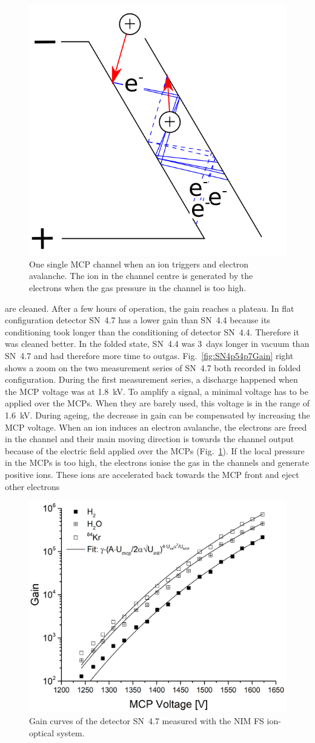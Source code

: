 	\begin{figure}[H]
		\centering
		\includegraphics[width=.3\textwidth]{Experiments/DischargeMod.png}
		\caption{One single MCP channel when an ion triggers and electron avalanche. The ion in the channel centre is generated by the electrons when the gas pressure in the channel is too high.}
		\label{fig:expDischMod}
	\end{figure}
	 are cleaned. After a few hours of operation, the gain reaches a plateau. In flat configuration detector SN~4.7 has a lower gain than SN~4.4 because its conditioning took longer than the conditioning of detector SN~4.4. Therefore it was cleaned better. In the folded state, SN~4.4 was 3~days longer in vacuum than SN~4.7 and had therefore more time to outgas. Fig.~\ref{fig:SN4p54p7Gain} right shows a zoom on the two measurement series of SN~4.7 both recorded in folded configuration. During the first measurement series, a discharge happened when the MCP voltage was at 1.8~kV. To amplify a signal, a minimal voltage has to be applied over the MCPs. When they are barely used, this voltage is in the range of 1.6~kV. During ageing, the decrease in gain can be compensated by increasing the MCP voltage. When an ion induces an electron avalanche, the electrons are freed in the channel and their main moving direction is towards the channel output because of the electric field applied over the MCPs (Fig.~\ref{fig:expDischMod}). If the local pressure in the MCPs is too high, the electrons ionise the gas in the channels and generate positive ions. These ions are accelerated back towards the MCP front and eject other electrons 
	\begin{figure}[h!] %
		\centering
		\includegraphics[width=.7\textwidth]{Experiments/GainDetFSLabEl.png}
		\caption{Gain curves of the detector SN~4.7 measured with the NIM FS ion-optical system.}
		\label{fig:MCPGainCurve4p7}
	\end{figure}
